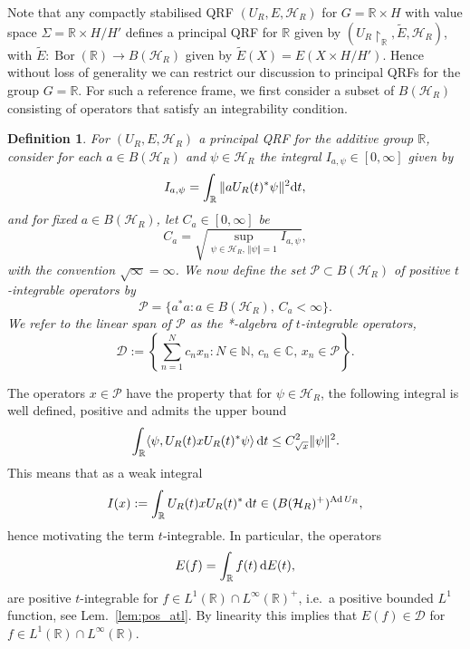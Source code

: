 \documentclass[sn-mathphys-num]{sn-jnl}%
\newcommand{\CC}{\mathbb{C}}
\newcommand{\RR}{\mathbb{R}}
\newcommand{\HH}{\mathcal{H}}
\DeclareMathOperator{\Bor}{Bor}
\DeclareMathOperator{\Ad}{Ad}
\newcommand{\diff}{\textup{d}}
\numberwithin{equation}{section}
\theoremstyle{thmstyleone}%
\theoremstyle{thmstyletwo}%
\theoremstyle{thmstylethree}%
\newtheorem{definition}[theorem]{Definition}%
\begin{document}
Note that any compactly stabilised QRF $(U_R,E,\HH_R)$ for $G=\RR\times H$ with value space $\Sigma=\RR\times H/H'$ defines a principal QRF for $\RR$ given by $(U_R\restriction_\RR,\tilde{E},\HH_R)$, with $\tilde{E}:\Bor(\RR)\to B(\HH_R)$ given by $\tilde{E}(X)=E(X\times H/H')$. Hence without loss of generality we can restrict our discussion to principal QRFs for the group $G=\RR$. For such a reference frame, we first consider a subset of $B(\HH_R)$ consisting of operators that satisfy an integrability condition.
\begin{definition}
\label{def:pos_atl}
    For $(U_R,E,\HH_R)$ a principal QRF for the additive group $\RR$, consider for each $a\in B(\HH_R)$ and $\psi\in\HH_R$ the integral $I_{a,\psi}\in[0,\infty]$ given by
    \begin{equation}
        I_{a,\psi}=\int_\RR \Vert aU_R(t)^*\psi\Vert^2\diff t,
    \end{equation}
    and for fixed $a\in B(\HH_R)$, let $C_a\in [0,\infty]$ be
    \begin{equation}\label{eq:Ca}        C_a=\sqrt{\sup_{\psi\in\HH_R,\,\Vert\psi\Vert=1}I_{a,\psi}},
    \end{equation}
    with the convention $\sqrt{\infty}=\infty$. We now define the set $\mathcal{P}\subset B(\HH_R)$ of \textup{positive $t$-integrable operators} by
    \begin{equation}
        \mathcal{P}=\{a^*a:a\in B(\HH_R),\, C_a<\infty\}.
    \end{equation}
    We refer to the linear span of $\mathcal{P}$ as the \textup{*-algebra of $t$-integrable operators},
    \begin{equation}
        \mathcal{D}:=\left\{\sum_{n=1}^Nc_n x_n:N\in\mathbb{N},\, c_n\in\CC,\,x_n\in\mathcal{P}\right\}.
    \end{equation}
\end{definition}
The operators $x\in\mathcal{P}$ have the property that for $\psi\in\HH_R$, the following integral is well defined, positive and admits the upper bound
\begin{equation}
    \int_\RR \langle\psi ,U_R(t)xU_R(t)^*\psi\rangle \,\diff t\leq C_{\sqrt{x}}^2\Vert\psi\Vert^2. 
\end{equation}
This means that as a weak integral
\begin{equation}
    I(x):=\int_\RR  U_R(t)xU_R(t)^*\,\diff t\in (B(\HH_R)^+)^{\Ad U_R},
\end{equation}
hence motivating the term $t$-integrable. In particular, the operators 
\begin{equation}
    E(f)=\int_\RR f(t)\,\diff E(t),
\end{equation}
are positive $t$-integrable for $f\in L^1(\RR)\cap L^\infty(\RR)^+$, i.e.\ a positive bounded $L^1$ function, see Lem.\ \ref{lem:pos_atl}. By linearity this implies that $E(f)\in\mathcal{D}$ for $f\in L^1(\RR)\cap L^\infty(\RR)$.
\end{document}
